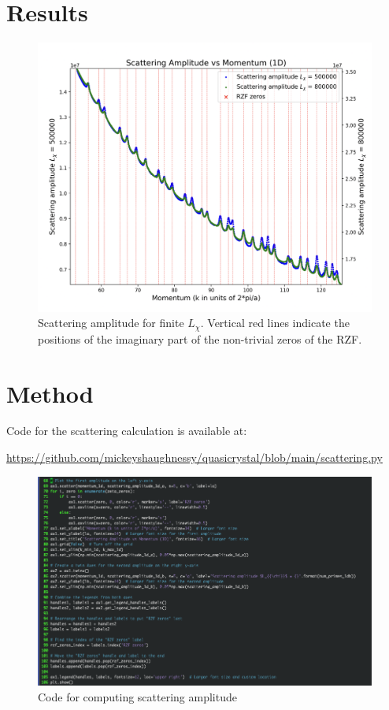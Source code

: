 \documentclass[11pt, oneside]{article}
\begin{document}
\section{Results}
\begin{figure}[htbp]
\begin{center}
    \includegraphics[width=0.8\linewidth]{../images/zoomed_scattering.png}
\caption{Scattering amplitude for finite $L_{\chi}$. Vertical red lines indicate the positions of the imaginary part of the non-trivial zeros of the RZF.}
\label{fig:scattering_amplitude}
\end{center}
\end{figure}

\section{Method}

Code for the scattering calculation is available at:
 
\url{https://github.com/mickeyshaughnessy/quasicrystal/blob/main/scattering.py}
 
\begin{figure}[htbp]
\begin{center}
    \includegraphics[width=0.8\linewidth]{../images/scattering_code.png}
\caption{Code for computing scattering amplitude}
\label{fig:scattering_code}
\end{center}
\end{figure}
 
\end{document}
